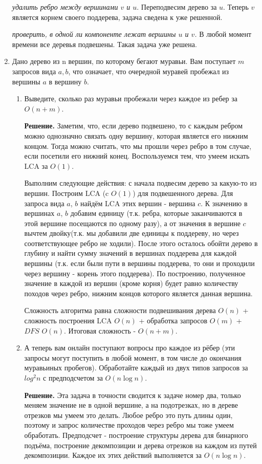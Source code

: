 \begin{enumerate}
	\textit{удалить ребро между вершинами $v$ и $u$}. Переподвесим дерево за $u$. Теперь $v$ является корнем 
	своего поддерева, задача сведена к уже решенной.
	
	\textit{проверить, в одной ли компоненте лежат вершины $u$ и $v$.} В любой момент времени все деревья 
	подвешены. Такая задача уже решена.
	
	\item Дано дерево из n вершин, по которому бегают муравьи. Вам поступает $m$ запросов вида $a, b$, что 
	означает, что очередной муравей пробежал из вершины $a$ в вершину $b$.
	
	\begin{enumerate}
		\item Выведите, сколько раз муравьи пробежали через каждое из ребер за $O(n + m)$.
		
		\textbf{Решение. } Заметим, что, если дерево подвешено, то с каждым ребром можно однозначно связать одну 
		вершину, которая является его нижним концом. Тогда можно считать, что мы прошли через ребро в том случае, 
		если посетили его нижний конец. Воспользуемся тем, что умеем искать LCA за $O(1)$. 
		
		Выполним следующие действия: с начала подвесим дерево за какую-то из вершин. Построим LCA (c $O(1)$) для 
		подвешенного дерева. Для запроса вида $a$, $b$ найдём LCA этих вершин - вершина $c$. К значению в 
		вершинах $a$, $b$ добавим единицу (т.к. ребра, которые заканчиваются в этой вершине посещаются по одному 
		разу), а от значения в вершине $c$ вычтем двойку(т.к. мы добавили две единицы к поддереву, но через 
		соответствующее ребро не ходили). После этого осталось обойти дерево в глубину и найти сумму значений в 
		вершинах поддерева для каждой вершины (т.к. если были пути в вершины поддерева, то они и проходили через 
		вершину - корень этого поддерева). По построению, полученное значение в каждой из вершин (кроме корня) 
		будет равно количеству походов через ребро, нижним концов которого является данная вершина.
		
		Сложность алгоритма равна сложности подвешивания дерева $O(n)$ + сложность построения LCA $O(n)$ + 
		обработка запросов $O(m)$ + $DFS$ $O(n)$. Итоговая сложность - $O(n + m)$.
	
		\item А теперь вам онлайн поступают вопросы про каждое из рёбер (эти запросы могут поступить в любой 
		момент, в том числе до окончания муравьиных пробегов). Обработайте каждый из двух типов запросов за 
		$log^2 n$ с предподсчетом за $O(n \log n)$.
		
		\textbf{Решение. } Эта задача в точности сводится к задаче номер два, только меняем значение не в одной 
		вершине, а на подотрезках, но в дереве отрезков мы умеем это делать. Любое ребро это путь длины один, 
		поэтому и запрос количестве проходов через ребро мы тоже умеем обработать. Предподсчет - построение 
		структуры дерева для бинарного подъёма, построение декомпозиции и дерева отрезков на каждом из путей 
		декомпозиции. Каждое их этих действий выполняется за $O(n \log n)$. 
	\end{enumerate}
\end{enumerate}
